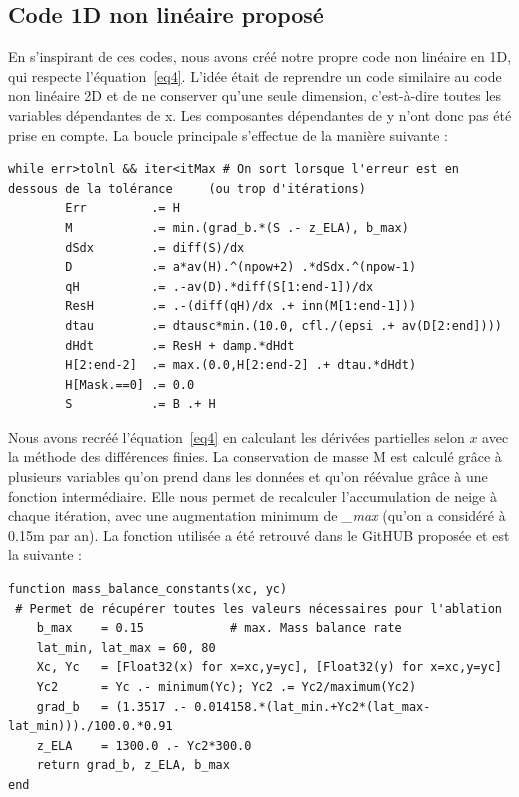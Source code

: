 \documentclass{article}
\begin{document}
\subsection{Code 1D non linéaire proposé}
En s'inspirant de ces codes, nous avons créé notre propre code non linéaire en 1D, qui respecte l'équation~\eqref{eq4}. L'idée était de reprendre un code similaire au code non linéaire 2D et de ne conserver qu'une seule dimension, c'est-à-dire toutes les variables dépendantes de x. Les composantes dépendantes de y n'ont donc pas été prise en compte. La boucle principale s'effectue de la manière suivante :
\newline
\begin{verbatim}
while err>tolnl && iter<itMax # On sort lorsque l'erreur est en 
dessous de la tolérance 	(ou trop d'itérations)
        Err         .= H                                               
        M           .= min.(grad_b.*(S .- z_ELA), b_max)            
        dSdx        .= diff(S)/dx 
        D           .= a*av(H).^(npow+2) .*dSdx.^(npow-1)              
        qH          .= .-av(D).*diff(S[1:end-1])/dx                     
        ResH        .= .-(diff(qH)/dx .+ inn(M[1:end-1])) 
        dtau        .= dtausc*min.(10.0, cfl./(epsi .+ av(D[2:end])))
        dHdt        .= ResH + damp.*dHdt                                
        H[2:end-2]  .= max.(0.0,H[2:end-2] .+ dtau.*dHdt)               
        H[Mask.==0] .= 0.0
        S           .= B .+ H                                       
\end{verbatim}
Nous avons recréé l'équation~\eqref{eq4} en calculant les dérivées partielles selon ${x}$ avec la méthode des différences finies.
La conservation de masse M est calculé grâce à plusieurs variables qu'on prend dans les données et qu'on réévalue grâce à une fonction intermédiaire. Elle nous permet de recalculer l'accumulation de neige à chaque itération, avec une augmentation minimum de \textit{\_max} (qu'on a considéré à 0.15m par an). La fonction utilisée a été retrouvé dans le GitHUB proposée et est la suivante :
\begin{verbatim}
function mass_balance_constants(xc, yc)
 # Permet de récupérer toutes les valeurs nécessaires pour l'ablation
    b_max    = 0.15            # max. Mass balance rate
    lat_min, lat_max = 60, 80
    Xc, Yc   = [Float32(x) for x=xc,y=yc], [Float32(y) for x=xc,y=yc]
    Yc2      = Yc .- minimum(Yc); Yc2 .= Yc2/maximum(Yc2)
    grad_b   = (1.3517 .- 0.014158.*(lat_min.+Yc2*(lat_max-lat_min)))./100.0.*0.91 
    z_ELA    = 1300.0 .- Yc2*300.0                              
    return grad_b, z_ELA, b_max
end                                   
\end{verbatim}
\end{document}
